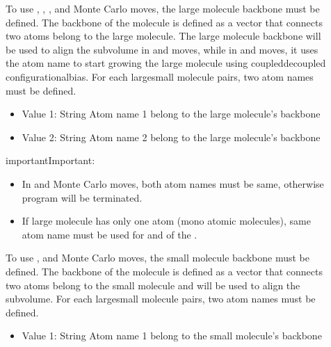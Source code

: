 \documentclass[letterpaper,10pt,english]{sphinxmanual}
\begin{document}
\begin{description}
\item[{}] \leavevmode
\sphinxAtStartPar
To use , , , and  Monte Carlo moves, the large molecule backbone must be defined. The backbone of the molecule is defined as a vector that connects two atoms belong to the large molecule.
The large molecule backbone will be used to align the sub\sphinxhyphen{}volume in  and  moves, while in  and  moves, it uses the atom name to start growing the large molecule using coupled\sphinxhyphen{}decoupled configurational\sphinxhyphen{}bias.
For each large\sphinxhyphen{}small molecule pairs, two atom names must be defined.
\begin{itemize}
\item {} 
\sphinxAtStartPar
Value 1: String \sphinxhyphen{} Atom name 1 belong to the large molecule’s backbone

\item {} 
\sphinxAtStartPar
Value 2: String \sphinxhyphen{} Atom name 2 belong to the large molecule’s backbone

\end{itemize}

\begin{sphinxadmonition}{important}{Important:}\begin{itemize}
\item {} 
\sphinxAtStartPar
In  and  Monte Carlo moves, both atom names must be same, otherwise program will be terminated.

\item {} 
\sphinxAtStartPar
If large molecule has only one atom (mono atomic molecules), same atom name must be used for  and  of the .

\end{itemize}
\end{sphinxadmonition}

\item[{}] \leavevmode
\sphinxAtStartPar
To use , and  Monte Carlo moves, the small molecule backbone must be defined. The backbone of the molecule is defined as a vector that connects two atoms belong to the small molecule and will be used to align the sub\sphinxhyphen{}volume.
For each large\sphinxhyphen{}small molecule pairs, two atom names must be defined.
\begin{itemize}
\item {} 
\sphinxAtStartPar
Value 1: String \sphinxhyphen{} Atom name 1 belong to the small molecule’s backbone


\end{itemize}
\end{description}
\end{document}
